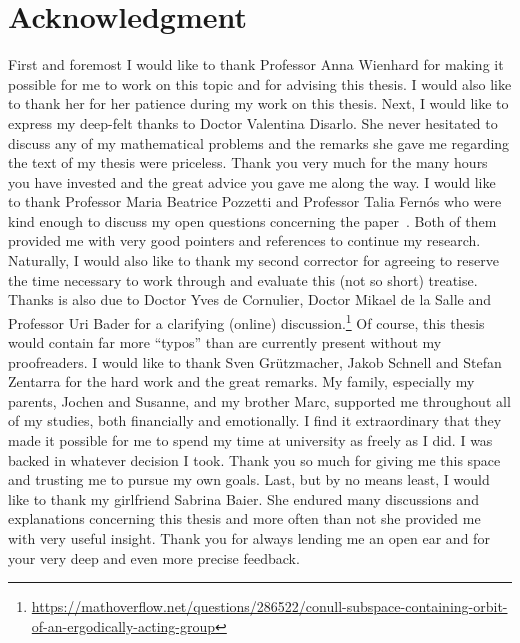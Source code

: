 \clearpage
{}
\markleft{}
\pagestyle{useheadings}
\section*{Acknowledgment}
%
\label{sec:acknowledgement}

First and foremost I would like to thank Professor Anna Wienhard for making it possible for me to work on this topic and for advising this thesis. I would also like to thank her for her patience during my work on this thesis. Next, I would like to express my deep-felt thanks to Doctor Valentina Disarlo. She never hesitated to discuss any of my mathematical problems and the remarks she gave me regarding the text of my thesis were priceless. Thank you very much for the many hours you have invested and the great advice you gave me along the way.
I would like to thank Professor Maria Beatrice Pozzetti and Professor Talia Fernós who were kind enough to discuss my open questions concerning the paper~\cite{MR3509968}. Both of them provided me with very good pointers and references to continue my research. Naturally, I would also like to thank my second corrector for agreeing to reserve the time necessary to work through and evaluate this (not so short) treatise.
Thanks is also due to Doctor Yves de Cornulier, Doctor Mikael de la Salle and Professor Uri Bader for a clarifying (online) discussion.\footnote{\url{https://mathoverflow.net/questions/286522/conull-subspace-containing-orbit-of-an-ergodically-acting-group}} 
Of course, this thesis would contain far more \enquote{typos} than are currently present without my proofreaders. I would like to thank Sven Grützmacher, Jakob Schnell and Stefan Zentarra for the hard work and the great remarks.
My family, especially my parents, Jochen and Susanne, and my brother Marc, supported me throughout all of my studies, both financially and emotionally. I find it extraordinary that they made it possible for me to spend my time at university as freely as I did. I was backed in whatever decision I took. Thank you so much for giving me this space and trusting me to pursue my own goals.
Last, but by no means least, I would like to thank my girlfriend Sabrina Baier. She endured many discussions and explanations concerning this thesis and more often than not she provided me with very useful insight. Thank you for always lending me an open ear and for your very deep and even more precise feedback.

\clearpage
\pagestyle{useheadings}

